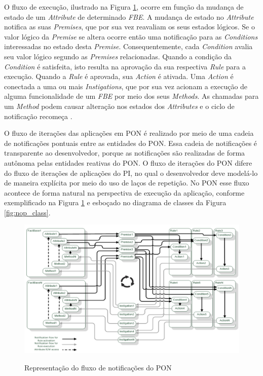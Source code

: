 O fluxo de execução, ilustrado na Figura \ref{fig:nop_chain}, ocorre em função
da mudança de estado de um \textit{Attribute} de determinado \textit{FBE}. A
mudança de estado no \textit{Attribute} notifica as suas \textit{Premises}, que
por sua vez reavaliam os seus estados lógicos. Se o valor lógico da
\textit{Premise} se altera ocorre então uma notificação para as
\textit{Conditions} interessadas no estado desta \textit{Premise}.
Consequentemente, cada \textit{Condition} avalia seu valor lógico segundo as
\textit{Premises} relacionadas. Quando a condição da \textit{Condition} é
satisfeita, isto resulta na aprovação da sua respectiva \textit{Rule} para a
execução. Quando a \textit{Rule} é aprovada, sua \textit{Action} é ativada. Uma
\textit{Action} é conectada a uma ou mais \textit{Instigations}, que por sua vez
acionam a execução de alguma funcionalidade de um \textit{FBE} por meio dos seus
\textit{Methods}. As chamadas para um \textit{Method} podem causar alteração nos
estados dos \textit{Attributes} e o ciclo de notificação recomeça
\cite{msc_Banaszewski_2009}.

O fluxo de iterações das aplicações em PON é realizado por meio de uma cadeia de
notificações pontuais entre as entidades do PON. Essa cadeia de notificações é
transparente ao desenvolvedor, porque as notificações são realizadas de forma
autônoma pelas entidades reativas do PON. O fluxo de iterações do PON difere do
fluxo de iterações de aplicações do PI, no qual o desenvolvedor deve modelá-lo
de maneira explícita por meio do uso de laços de repetição. No PON esse fluxo
acontece de forma natural na perspectiva de execução da aplicação, conforme
exemplificado na Figura \ref{fig:nop_chain} e esboçado no diagrama de classes da
Figura \ref{fig:nop_class}.

\begin{figure}[!htb]
  \centering
  \caption{Representação do fluxo de notificações do PON}
  \includegraphics[width=\textwidth]{../figures/notificacoes_linhares.png}
  \smallskip
  \label{fig:nop_chain}
\end{figure}

